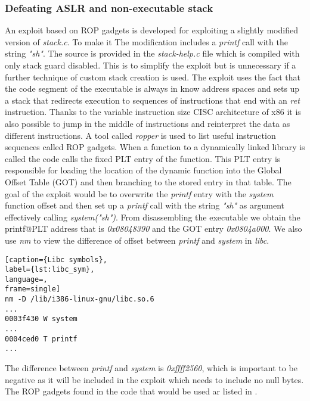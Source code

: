 \subsubsection { Defeating ASLR and non-executable stack }
An exploit based on ROP gadgets\cite{rops} is developed for exploiting a slightly modified version of \emph{stack.c}. To make it The modification includes a \emph{printf} call with the string \emph{"sh"}. The source is provided in the \emph{stack-help.c} file which is compiled with only stack guard disabled. This is to simplify the exploit but is unnecessary if a further technique of custom stack creation is used. The exploit uses the fact that the code segment of the executable is always in know address spaces and sets up a stack that redirects execution to sequences of instructions that end with an \emph{ret} instruction. Thanks to the variable instruction size CISC architecture of x86 it is also possible to jump in the middle of instructions and reinterpret the data as different instructions. A tool called \emph{ropper}\cite{ropper} is used to list useful instruction sequences called ROP gadgets. When a function to a dynamically linked library is called the code calls the fixed PLT entry of the function. This PLT entry is responsible for loading the location of the dynamic function into the Global Offset Table (GOT) and then branching to the stored entry in that table. The goal of the exploit would be to overwrite the \emph{printf} entry with the \emph{system} function offset and then set up a \emph{printf} call with the string \emph{"sh"} as argument effectively calling \emph{system("sh")}. From disassembling the executable we obtain the printf@PLT address that is \emph{0x08048390} and the GOT entry \emph{0x0804a000}. We also use \emph{nm} to view the difference of offset between \emph{printf} and \emph{system} in \emph{libc}.

\begin{minipage}{\linewidth}
\begin{lstlisting}[caption={Libc symbols},
label={lst:libc_sym},
language=,
frame=single]
nm -D /lib/i386-linux-gnu/libc.so.6
...
0003f430 W system
...
0004ced0 T printf
...
\end{lstlisting}
\end{minipage}

The difference between \emph{printf} and \emph{system} is \emph{0xffff2560}, which is important to be negative as it will be included in the exploit which needs to include no null bytes. The ROP gadgets found in the code that would be used ar listed in .

